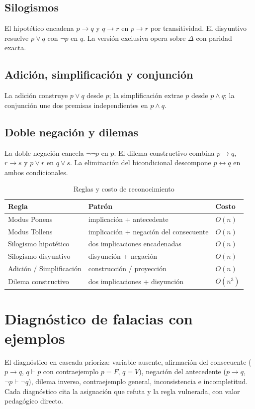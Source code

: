 \documentclass[11pt,a4paper,openany]{book}
\begin{document}
\section{Silogismos}
El hipot\'etico encadena $p \to q$ y $q \to r$ en $p \to r$ por transitividad. El disyuntivo resuelve $p \lor q$ con $\lnot p$ en $q$. La versi\'on exclusiva opera sobre $\Delta$ con paridad exacta.
\section{Adici\'on, simplificaci\'on y conjunci\'on}
La adici\'on construye $p \lor q$ desde $p$; la simplificaci\'on extrae $p$ desde $p \land q$; la conjunci\'on une dos premisas independientes en $p \land q$.
\section{Doble negaci\'on y dilemas}
La doble negaci\'on cancela $\lnot\lnot p$ en $p$. El dilema constructivo combina $p \to q$, $r \to s$ y $p \lor r$ en $q \lor s$. La eliminaci\'on del bicondicional descompone $p \leftrightarrow q$ en ambos condicionales.
\begin{table}[H]
\centering
\caption{Reglas y costo de reconocimiento}
\begin{tabular}{lll}
\toprule
Regla & Patr\'on & Costo \\
\midrule
Modus Ponens & implicaci\'on + antecedente & $O(n)$ \\
Modus Tollens & implicaci\'on + negaci\'on del consecuente & $O(n)$ \\
Silogismo hipot\'etico & dos implicaciones encadenadas & $O(n)$ \\
Silogismo disyuntivo & disyunci\'on + negaci\'on & $O(n)$ \\
Adici\'on / Simplificaci\'on & construcci\'on / proyecci\'on & $O(n)$ \\
Dilema constructivo & dos implicaciones + disyunci\'on & $O(n^{3})$ \\
\bottomrule
\end{tabular}
\end{table}

\chapter{Diagn\'ostico de falacias con ejemplos}
\label{ch:falacias}
El diagn\'ostico en cascada prioriza: variable ausente, afirmaci\'on del consecuente ($p \to q$, $q \vdash p$ con contraejemplo $p = F$, $q = V$), negaci\'on del antecedente ($p \to q$, $\lnot p \vdash \lnot q$), dilema inverso, contraejemplo general, inconsistencia e incompletitud. Cada diagn\'ostico cita la asignaci\'on que refuta y la regla vulnerada, con valor pedag\'ogico directo.
\end{document}
